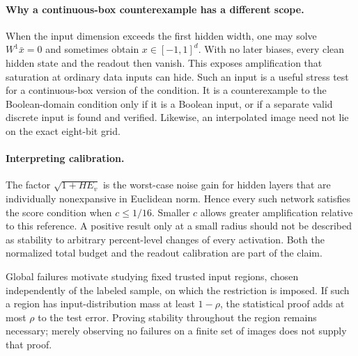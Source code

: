 \paragraph{Why a continuous-box counterexample has a different scope.}
When the input dimension exceeds the first hidden width, one may solve
$W^1\bar x=0$ and sometimes obtain $x\in[-1,1]^d$. With no later biases,
every clean hidden state and the readout then vanish. This exposes
amplification that saturation at ordinary data inputs can hide. Such an
input is a useful stress test for a continuous-box version of the condition.
It is a counterexample to the Boolean-domain condition only if it is a
Boolean input, or if a separate valid discrete input is found and verified.
Likewise, an interpolated image need not lie on the exact eight-bit grid.

\paragraph{Interpreting calibration.}
The factor $\sqrt{1+HE_v}$ is the worst-case noise gain for hidden layers
that are individually nonexpansive in Euclidean norm. Hence every such
network satisfies the score condition when $c\le1/16$. Smaller $c$ allows
greater amplification relative to this reference. A positive result only
at a small radius should not be described as stability to arbitrary
percent-level changes of every activation. Both the normalized total
budget and the readout calibration are part of the claim.

Global failures motivate studying fixed trusted input regions, chosen
independently of the labeled sample, on which the restriction is imposed.
If such a region has input-distribution mass at least $1-\rho$, the
statistical proof adds at most $\rho$ to the test error. Proving stability
throughout the region remains necessary; merely observing no failures on
a finite set of images does not supply that proof.
